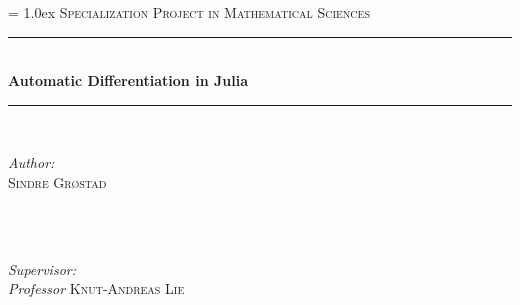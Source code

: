 \begin{titlepage}

\newcommand{\HRule}{\rule{\linewidth}{0.5mm}} %

\center %
 

\parindent=0.0cm
\parskip = 1.0ex
\vspace*{1.5cm}
\textsc{\Large Specialization Project in Mathematical Sciences}\\[0.5cm] %


\HRule \\[0.7cm]
{ \huge \bfseries Automatic Differentiation in Julia}\\[0.4cm] %
\HRule \\[1.5cm]
 

\begin{minipage}{0.4\textwidth}
\begin{flushleft} \large
\emph{Author:} \\ 
\textsc{Sindre Grøstad} \\ %
\textsc{ } \\
\end{flushleft}
\end{minipage}
~
\begin{minipage}{0.5\textwidth}
\begin{flushright} \large
\emph{Supervisor:} \\
\emph{Professor} \textsc{Knut-Andreas Lie} \\%
\end{flushright}
\end{minipage}\\[4cm]
\vspace{5cm}


\end{titlepage}

